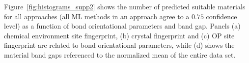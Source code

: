 \documentclass[superscriptaddress,unsortedaddress,
 amsmath,amssymb,
 aps,
]{revtex4-2}
\begin{document}
Figure~\ref{fig:histograms_supp2} shows the number of predicted suitable materials for all approaches (all ML methods in an approach agree to a $0.75$ confidence level) as a function of bond orientational parameters and band gap. 
Panels (a) chemical environment site fingerprint, (b) crystal fingerprint and (c) OP site fingerprint are related to bond orientational parameters, while (d) shows the material band gaps referenced to the normalized mean of the entire data set.  

\newpage 

\end{document}
